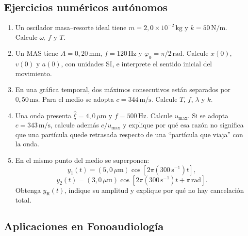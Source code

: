 \subsection*{Ejercicios numéricos autónomos}

\begin{enumerate}[label=\textbf{N\arabic*.},leftmargin=*]
    \item Un oscilador masa--resorte ideal tiene
    \(m=2{,}0\times10^{-2}\,\text{kg}\) y
    \(k=50\,\text{N}/\text{m}\). Calcule \(\omega\), \(f\) y \(T\).

    \item Un MAS tiene \(A=0{,}20\,\text{mm}\),
    \(f=120\,\text{Hz}\) y
    \(\varphi_0=\pi/2\,\text{rad}\). Calcule \(x(0)\), \(v(0)\) y
    \(a(0)\), con unidades SI, e interprete el sentido inicial del
    movimiento.

    \item En una gráfica temporal, dos máximos consecutivos están separados
    por \(0{,}50\,\text{ms}\). Para el medio se adopta
    \(c=344\,\text{m}/\text{s}\). Calcule \(T\), \(f\), \(\lambda\) y \(k\).

    \item Una onda presenta
    \(\hat{\xi}=4{,}0\,\mu\text{m}\) y
    \(f=500\,\text{Hz}\). Calcule \(u_{\max}\). Si se adopta
    \(c=343\,\text{m}/\text{s}\), calcule además \(c/u_{\max}\) y explique
    por qué esa razón no significa que una partícula quede retrasada respecto
    de una ``partícula que viaja'' con la onda.

    \item En el mismo punto del medio se superponen:
    \[
        y_1(t)=(5{,}0\,\mu\text{m})
        \cos\left[2\pi(300\,\text{s}^{-1})t\right],
    \]
    \[
        y_2(t)=(3{,}0\,\mu\text{m})
        \cos\left[2\pi(300\,\text{s}^{-1})t+\pi\,\text{rad}\right].
    \]
    Obtenga \(y_\mathrm{R}(t)\), indique su amplitud y explique por qué no hay
    cancelación total.
\end{enumerate}

\subsection*{Aplicaciones en Fonoaudiología}

